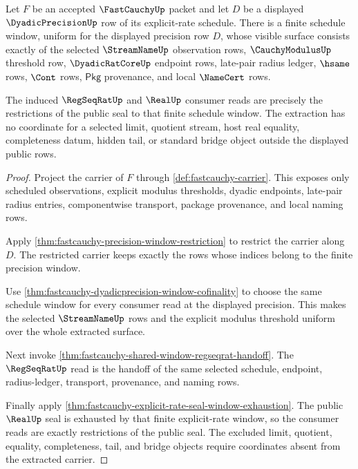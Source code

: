 \begin{theorem}
\label{thm:fastcauchy-uniform-streamname-window-extraction}
Let $F$ be an accepted $\FastCauchyUp$ packet and let $D$ be a displayed
$\DyadicPrecisionUp$ row of its explicit-rate schedule. There is a finite
schedule window, uniform for the displayed precision row $D$, whose visible
surface consists exactly of the selected $\StreamNameUp$ observation rows,
$\CauchyModulusUp$ threshold row, $\DyadicRatCoreUp$ endpoint rows,
late-pair radius ledger, $\hsame$ rows, $\Cont$ rows, $\mathsf{Pkg}$
provenance, and local $\NameCert$ rows.

The induced $\RegSeqRatUp$ and $\RealUp$ consumer reads are precisely the
restrictions of the public seal to that finite schedule window. The extraction
has no coordinate for a selected limit, quotient stream, host real equality,
completeness datum, hidden tail, or standard bridge object outside the
displayed public rows.
\end{theorem}
\begin{proof}
Project the carrier of $F$ through \autoref{def:fastcauchy-carrier}. This
exposes only scheduled observations, explicit modulus thresholds, dyadic
endpoints, late-pair radius entries, componentwise transport, package
provenance, and local naming rows.

Apply \autoref{thm:fastcauchy-precision-window-restriction} to restrict the
carrier along $D$. The restricted carrier keeps exactly the rows whose indices
belong to the finite precision window.

Use \autoref{thm:fastcauchy-dyadicprecision-window-cofinality} to choose the
same schedule window for every consumer read at the displayed precision. This
makes the selected $\StreamNameUp$ rows and the explicit modulus threshold
uniform over the whole extracted surface.

Next invoke \autoref{thm:fastcauchy-shared-window-regseqrat-handoff}. The
$\RegSeqRatUp$ read is the handoff of the same selected schedule, endpoint,
radius-ledger, transport, provenance, and naming rows.

Finally apply
\autoref{thm:fastcauchy-explicit-rate-seal-window-exhaustion}. The public
$\RealUp$ seal is exhausted by that finite explicit-rate window, so the
consumer reads are exactly restrictions of the public seal. The excluded
limit, quotient, equality, completeness, tail, and bridge objects require
coordinates absent from the extracted carrier.
\end{proof}

